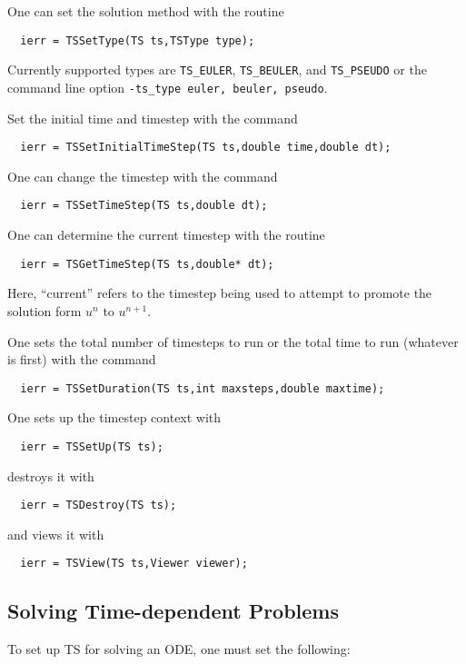 {One can set the solution method with the routine
\begin{verbatim}
  ierr = TSSetType(TS ts,TSType type);
\end{verbatim}
 Currently supported types are {\tt TS\_EULER},
{\tt TS\_BEULER}, and {\tt TS\_PSEUDO}
  
or the command line option
{\tt -ts\_type euler, beuler, pseudo}.  


Set the initial time and timestep with the command
\begin{verbatim}
  ierr = TSSetInitialTimeStep(TS ts,double time,double dt);
\end{verbatim}
One  can change the timestep with the command
\begin{verbatim}
  ierr = TSSetTimeStep(TS ts,double dt);
\end{verbatim}
One  
can  determine the current timestep with the routine
\begin{verbatim}
  ierr = TSGetTimeStep(TS ts,double* dt);
\end{verbatim}
Here, ``current'' refers to the timestep being used to attempt to
promote the solution form $ u^n $ to $ u^{n+1}. $

One sets the total number of timesteps to run or the total time to run 
(whatever is first) with the command 
\begin{verbatim}
  ierr = TSSetDuration(TS ts,int maxsteps,double maxtime);
\end{verbatim}
One sets up the timestep context with 
\begin{verbatim}
  ierr = TSSetUp(TS ts);
\end{verbatim}
destroys it with 
\begin{verbatim}
  ierr = TSDestroy(TS ts);
\end{verbatim}
and views it with 
\begin{verbatim}
  ierr = TSView(TS ts,Viewer viewer);
\end{verbatim}

\subsection{Solving Time-dependent Problems}
To set up TS for solving an ODE, one must set the following:

}
